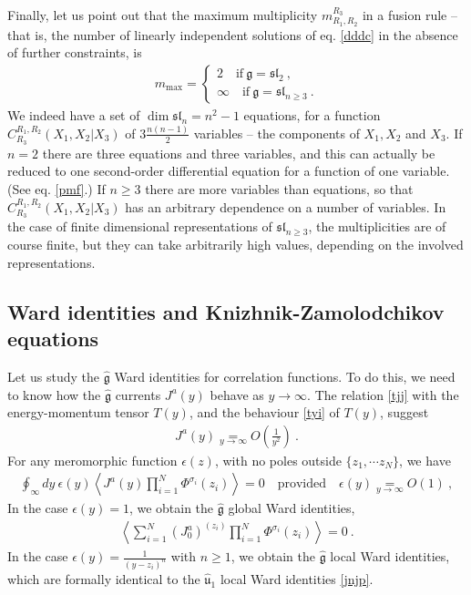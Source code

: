 \documentclass[12pt,a4paper,notitlepage]{report}
\numberwithin{equation}{section}
\theoremstyle{break}
\begin{document}
Finally, let us point out that the maximum multiplicity $m_{R_1,R_2}^{R_3}$ in a fusion rule -- that is, the number of linearly independent solutions of eq. \eqref{dddc} in the absence of further constraints, is 
\begin{align}
 m_{\mathrm{max}} = \left\{\begin{array}{l}  2 \quad \text{if}\ \mathfrak{g}=\mathfrak{sl}_2\ , \\ \infty \quad \text{if}\ \mathfrak{g}=\mathfrak{sl}_{n\geq 3}\ . \end{array}\right. 
\end{align}
We indeed have a set of $\dim \mathfrak{sl}_n=n^2-1$ equations, for a function $C^{R_1,R_2}_{R_3}(X_1,X_2|X_3)$ of $3\frac{n(n-1)}{2}$ variables -- the components of $X_1,X_2$ and $X_3$.
If $n=2$ there are three equations and three variables, and this can actually be reduced to one second-order differential equation for a function of one variable. (See eq. \eqref{pmf}.)
If $n\geq 3$ there are more variables than equations, so that $C^{R_1,R_2}_{R_3}(X_1,X_2|X_3)$ has an arbitrary dependence on a number of variables.
In the case of finite dimensional representations of $\mathfrak{sl}_{n\geq 3}$, the multiplicities are of course finite, but they can take arbitrarily high values, depending on the involved representations.

\subsection{Ward identities and Knizhnik-Zamolodchikov equations \label{secwikz}}

Let us study the $\hat{\mathfrak{g}}$ Ward identities for correlation functions.
To do this, we need to know how the $\hat{\mathfrak{g}}$ currents $J^a(y)$ behave as $y\rightarrow \infty$.
The relation \eqref{tjj} with the energy-momentum tensor $T(y)$, and the behaviour \eqref{tyi} of $T(y)$, suggest
\begin{align}
 \boxed{J^a(y) \underset{y\rightarrow \infty}{=} O\left(\frac{1}{y^2}\right)}\ .
\label{jayi}
\end{align}
For any meromorphic function $\epsilon(z)$, with no poles outside $\{z_1,\cdots z_N\}$, we have 
\begin{align}
 \oint_\infty dy\ \epsilon(y) \left\langle J^a(y)  \prod_{i=1}^N \Phi^{\sigma_i}(z_i)\right\rangle = 0 \quad \text{provided} \quad \epsilon(y) \underset{y\rightarrow\infty}{=} O(1)\ ,
\end{align}
In the case $\epsilon(y)=1$, we obtain the $\hat{\mathfrak{g}}$ global Ward identities,
\begin{align}
 \left\langle \sum_{i=1}^N (J_0^a)^{(z_i)} \prod_{i=1}^N \Phi^{\sigma_i}(z_i)\right\rangle=0\ .
\end{align}
In the case $\epsilon(y)=\frac{1}{(y-z_i)^n}$ with $n\geq 1$, we obtain the $\hat{\mathfrak{g}}$ local Ward identities, which are formally identical to the $\hat{\mathfrak{u}}_1$ local Ward identities \eqref{jnjp}. 
\end{document}

